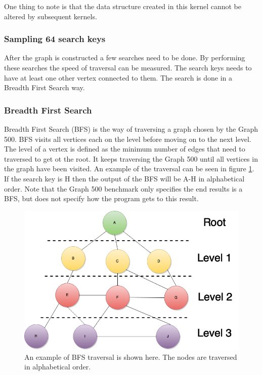 One thing to note is that the data structure created in this kernel cannot be altered by subsequent kernels. 

\subsubsection{Sampling 64 search keys}
After the graph is constructed a few searches need to be done. By performing these searches the speed of traversal can be measured. The search keys needs to have at least one other vertex connected to them. The search is done in a Breadth First Search way.

\subsubsection{Breadth First Search}
Breadth First Search\cite{bfs} (BFS) is the way of traversing a graph chosen by the Graph 500. BFS visits all vertices each on the level before moving on to the next level. The level of a vertex is defined as the minimum number of edges that need to traversed to get ot the root. It keeps traversing the Graph 500 until all vertices in the graph have been visited. An example of the traversal can be seen in figure \ref{fig:bfs}. If the search key is H then the output of the BFS will be A-H in alphabetical order.
Note that the Graph 500 benchmark only specifies the end results is a BFS, but does not specify how the program gets to this result.
\begin{figure}[!h]
	\includegraphics[width=\textwidth]{images/BFS-example1-with-levels}
	\caption{An example of BFS traversal is shown here. The nodes are traversed in alphabetical order.}
	\label{fig:bfs}
\end{figure}

